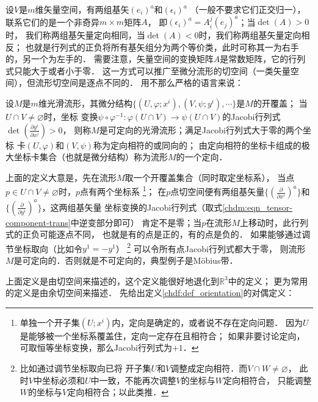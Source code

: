 设$V$是$m$维矢量空间，有两组基矢$(e_i)^a$和$(\epsilon_i)^a$
（一般不要求它们正交归一），联系它们的是一个非奇异$m\times m$矩阵$A$，
即$(\epsilon_i)^a = A_i^j (e_j)^a$；当$\det(A)>0$时，
我们称两组基矢量定向相同，当$\det(A)<0$时，我们称两组基矢量定向相反；
也就是行列式的正负将所有基矢组分为两个等价类，此时可称其一为右手的，另一个为左手的．
需要注意，矢量空间的变换矩阵$A$是常数矩阵，它的行列式只能大于或者小于零．
这一方式可以推广至微分流形的切空间（一类矢量空间），但流形切空间是逐点不同的．
用不那么严格的语言来说：


\begin{definition}\label{chdf:def_orientation}
    设$M$是$m$维光滑流形，其微分结构$\{(U,\varphi;x^i), (V,\psi;y^i), \cdots \}$是$M$的开覆盖；
    当$U \cap V\neq \varnothing$时，坐标
    变换$\psi \circ \varphi^{-1}: \varphi(U \cap V )\to \psi(U \cap V)$的Jacobi行列式
    $\det(\frac{\partial y^i }{\partial x^j}) >0$，
    则称$M$是{\heiti 可定向}的光滑流形；满足Jacobi行列式大于零的两个坐标
    卡$(U,\varphi)$和$(V,\psi)$称为{\heiti 定向相符的}或{\heiti 同向的}；
    由定向相符的坐标卡组成的极大坐标卡集合（也就是微分结构）称为流形$M$的一个{\heiti 定向}．
\end{definition}

上面的定义大意是，先在流形$M$取一个开覆盖集合（同时取定坐标系），
当点$p\in U \cap V\neq \varnothing$时，$p$点有两个坐标系
{\footnote{单独一个开子集$(U;x^i)$内，定向是确定的，或者说不存在定向问题．
因为$U$是能够被一个坐标系覆盖住，定向一定存在且相符合；
如果非要讨论定向，可取恒等坐标变换，那么Jacobi行列式为$+1$．}}；
在$p$点切空间便有两组基矢量$\{(\frac{\partial }{\partial x^i})^a\}$和
$\{(\frac{\partial }{\partial y^i})^a\}$，这两组基矢量
坐标变换的Jacobi行列式（取式\eqref{chdm:eqn_tensor-component-trans}中逆变部分即可）
肯定不是零；当$p$在流形$M$上移动时，此行列式的正负可能逐点不同，
也就是有的点是正的，有的点是负的．
如果能够通过调节坐标取向（比如令$y^1=-y^1$）{ \footnote{比如通过调节坐标取向已将
开子集$U$和$V$调整成定向相符．而$V\cap W\neq \varnothing$，
此时$V$中坐标必须和$U$中一致，不能再次调整$V$的坐标与$W$定向相符合，
只能调整$W$的坐标与$V$定向相符合；以此类推．}}
可以令所有点Jacobi行列式都大于零，
则流形$M$是可定向的．否则就是不可定向的，典型例子是M\"{o}bius带．

上面定义是由切空间来描述的，这个定义能很好地退化到$\mathbb{R}^3$中的定义；
更为常用的定义是由余切空间来描述．
先给出定义\ref{chdf:def_orientation}的对偶定义：

